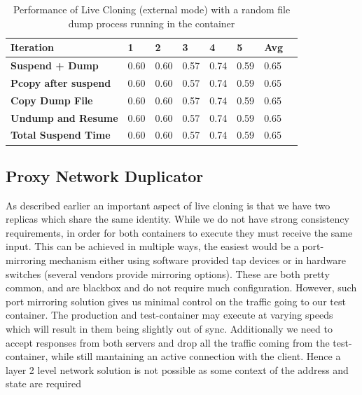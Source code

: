\begin{table}[t]
  \centering
    \begin{tabular}{ | p{2.2cm} | l | l | l | l | l | l | l |}
    \hline
    \textbf{Iteration} & \textbf{1} & \textbf{2} & \textbf{3} & \textbf{4} & \textbf{5} & \textbf{Avg} \\ \hline
    \textbf{Suspend + Dump} & 0.60 & 0.60 & 0.57 & 0.74 & 0.59 & 0.65\\ \hline
    \textbf{Pcopy after suspend} & 0.60 & 0.60 & 0.57 & 0.74 & 0.59 & 0.65\\ \hline
    \textbf{Copy Dump File} & 0.60 & 0.60 & 0.57 & 0.74 & 0.59 & 0.65\\ \hline
    \textbf{Undump and Resume} & 0.60 & 0.60 & 0.57 & 0.74 & 0.59 & 0.65\\ \hline
    \textbf{Total Suspend Time} & 0.60 & 0.60 & 0.57 & 0.74 & 0.59 & 0.65\\ \hline
    \end{tabular}
\caption{Performance of Live Cloning (external mode) with a random file dump process running in the container}
\label{table:clonePerf}
\end{table}

\subsection{Proxy Network Duplicator} 
\label{sec:proxyDuplicator}

As described earlier an important aspect of live cloning is that we have two replicas which share the same identity. 
While we do not have strong consistency requirements, in order for both containers to execute they must receive the same input.
This can be achieved in multiple ways, the easiest would be a port-mirroring mechanism either using software provided tap devices or in hardware switches (several vendors provide mirroring options). 
These are both pretty common, and are blackbox and do not require much configuration.
However, such port mirroring solution gives us minimal control on the traffic going to our test container.
The production and test-container may execute at varying speeds which will result in them being slightly out of sync.
Additionally we need to accept responses from both servers and drop all the traffic coming from the test-container, while still mantaining an active connection with the client.
Hence a layer 2 level network solution is not possible as some context of the address and state are required

